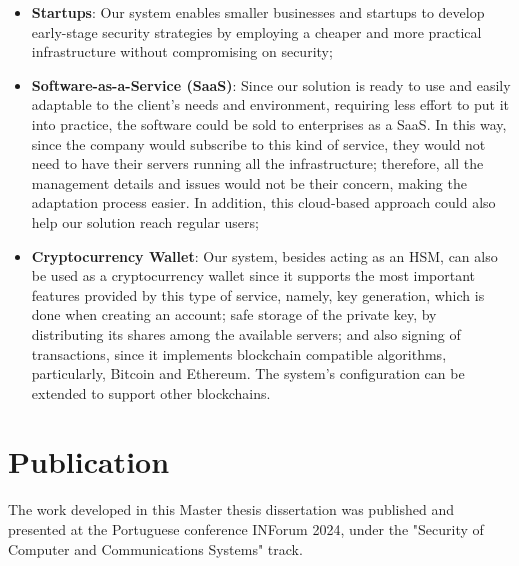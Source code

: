 \begin{itemize}
    \item \textbf{Startups}: Our system enables smaller businesses and startups to develop early-stage security strategies by employing a cheaper and more practical infrastructure without compromising on security;
    \item \textbf{Software-as-a-Service (SaaS)}: Since our solution is ready to use and easily adaptable to the client's needs and environment, requiring less effort to put it into practice, the software could be sold to enterprises as a SaaS. In this way, since the company would subscribe to this kind of service, they would not need to have their servers running all the infrastructure; therefore, all the management details and issues would not be their concern, making the adaptation process easier. In addition, this cloud-based approach could also help our solution reach regular users;
    \item \textbf{Cryptocurrency Wallet}: Our system, besides acting as an HSM, can also be used as a cryptocurrency wallet since it supports the most important features provided by this type of service, namely, key generation, which is done when creating an account; safe storage of the private key, by distributing its shares among the available servers; and also signing of transactions, since it implements blockchain compatible algorithms, particularly, Bitcoin and Ethereum. The system's configuration can be extended to support other blockchains.
\end{itemize}

\section{Publication}
The work developed in this Master thesis dissertation was published \cite{inforumpublication} and presented at the Portuguese conference INForum 2024, under the "Security of Computer and Communications Systems" track.

